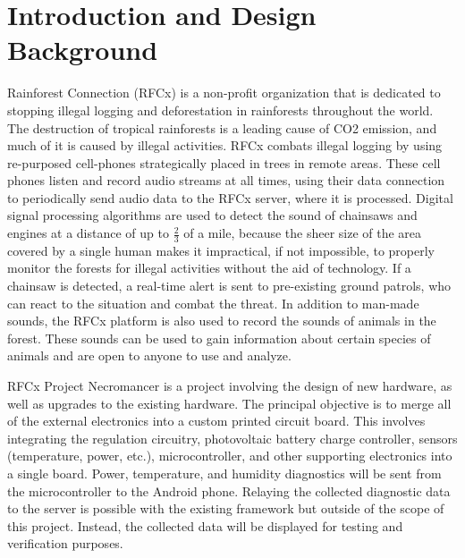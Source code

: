 \documentclass{article}
\newcommand{\ASSNMT}{Project Necromancer}
\begin{document}
{
\pagestyle{fancy}
\fancyhf{}
\lhead{\ASSNMT}
\setlength{\parindent}{0cm}
\newpage
\tableofcontents
\newpage
\section{Introduction and Design Background}
Rainforest Connection (RFCx) is a non-profit organization that is dedicated to stopping illegal logging and deforestation in rainforests throughout the world. The destruction of tropical rainforests is a leading cause of CO2 emission, and much of it is caused by illegal activities. RFCx combats illegal logging by using re-purposed cell-phones strategically placed in trees in remote areas. These cell phones listen and record audio streams at all times, using their data connection to periodically send audio data to the RFCx server, where it is processed. Digital signal processing algorithms are used to detect the sound of chainsaws and engines at a distance of up to $\frac{2}{3}$ of a mile, because the sheer size of the area covered by a single human makes it impractical, if not impossible, to properly monitor the forests for illegal activities without the aid of technology. If a chainsaw is detected, a real-time alert is sent to pre-existing ground patrols, who can react to the situation and combat the threat. In addition to man-made sounds, the RFCx platform is also used to record the sounds of animals in the forest. These sounds can be used to gain information about certain species of animals and are open to anyone to use and analyze.

\bigskip
RFCx Project Necromancer is a project involving the design of new hardware, as well as upgrades to the existing hardware. The principal objective is to merge all of the external electronics into a custom printed circuit board. This involves integrating the regulation circuitry, photovoltaic battery charge controller, sensors (temperature, power, etc.), microcontroller, and other supporting electronics into a single board. Power, temperature, and humidity diagnostics will be sent from the microcontroller to the Android phone. Relaying the collected diagnostic data to the server is possible with the existing framework but outside of the scope of this project. Instead, the collected data will be displayed for testing and verification purposes. 

}
\end{document}
